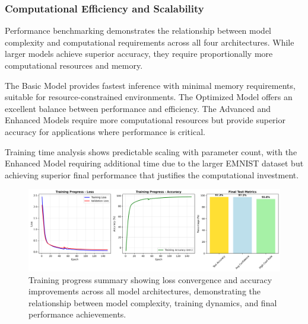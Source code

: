 \documentclass[11pt,a4paper]{report}
\begin{document}
\subsubsection{Computational Efficiency and Scalability}

Performance benchmarking demonstrates the relationship between model complexity and computational requirements across all four architectures. While larger models achieve superior accuracy, they require proportionally more computational resources and memory.

The Basic Model provides fastest inference with minimal memory requirements, suitable for resource-constrained environments. The Optimized Model offers an excellent balance between performance and efficiency. The Advanced and Enhanced Models require more computational resources but provide superior accuracy for applications where performance is critical.

Training time analysis shows predictable scaling with parameter count, with the Enhanced Model requiring additional time due to the larger EMNIST dataset but achieving superior final performance that justifies the computational investment.

\begin{figure}[H]
\centering
\includegraphics[width=\textwidth]{training_summary.png}
\caption{Training progress summary showing loss convergence and accuracy improvements across all model architectures, demonstrating the relationship between model complexity, training dynamics, and final performance achievements.}
\label{fig:training_summary}
\end{figure}
\end{document}
